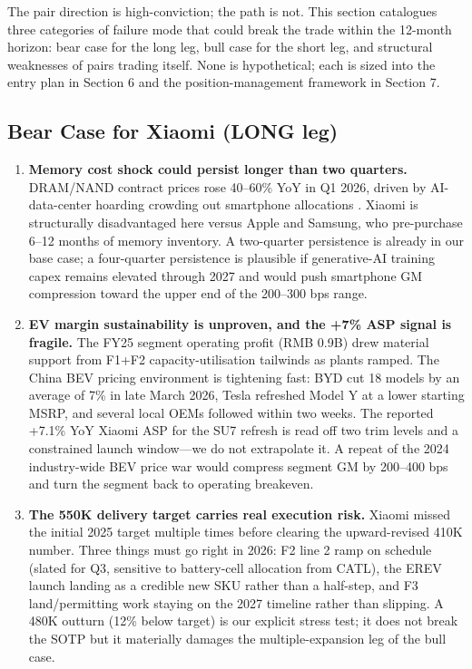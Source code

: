 \documentclass[11pt,a4paper]{article}
\begin{document}
The pair direction is high-conviction; the path is not. This section catalogues three categories of failure mode that could break the trade within the 12-month horizon: bear case for the long leg, bull case for the short leg, and structural weaknesses of pairs trading itself. None is hypothetical; each is sized into the entry plan in Section 6 and the position-management framework in Section 7.

\subsection{Bear Case for Xiaomi (LONG leg)}

\begin{enumerate}
\item \textbf{Memory cost shock could persist longer than two quarters.} DRAM/NAND contract prices rose 40--60\% YoY in Q1 2026, driven by AI-data-center hoarding crowding out smartphone allocations \cite{counterpoint2026q1}. Xiaomi is structurally disadvantaged here versus Apple and Samsung, who pre-purchase 6--12 months of memory inventory. A two-quarter persistence is already in our base case; a four-quarter persistence is plausible if generative-AI training capex remains elevated through 2027 and would push smartphone GM compression toward the upper end of the 200--300 bps range.
\item \textbf{EV margin sustainability is unproven, and the +7\% ASP signal is fragile.} The FY25 segment operating profit (RMB 0.9B) drew material support from F1+F2 capacity-utilisation tailwinds as plants ramped. The China BEV pricing environment is tightening fast: BYD cut 18 models by an average of 7\% in late March 2026, Tesla refreshed Model Y at a lower starting MSRP, and several local OEMs followed within two weeks. The reported +7.1\% YoY Xiaomi ASP for the SU7 refresh is read off two trim levels and a constrained launch window---we do not extrapolate it. A repeat of the 2024 industry-wide BEV price war would compress segment GM by 200--400 bps and turn the segment back to operating breakeven.
\item \textbf{The 550K delivery target carries real execution risk.} Xiaomi missed the initial 2025 target multiple times before clearing the upward-revised 410K number. Three things must go right in 2026: F2 line 2 ramp on schedule (slated for Q3, sensitive to battery-cell allocation from CATL), the EREV launch landing as a credible new SKU rather than a half-step, and F3 land/permitting work staying on the 2027 timeline rather than slipping. A 480K outturn (12\% below target) is our explicit stress test; it does not break the SOTP but it materially damages the multiple-expansion leg of the bull case.

\end{enumerate}
\end{document}
